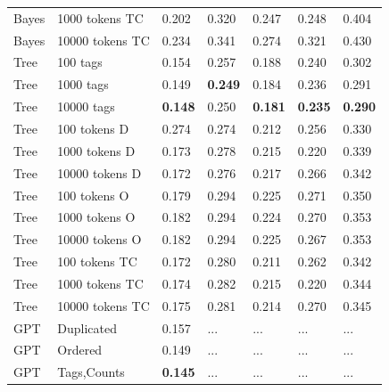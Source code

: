 \documentclass[sn-mathphys]{sn-jnl}%
\theoremstyle{thmstyleone}%
\theoremstyle{thmstyletwo}%
\theoremstyle{thmstylethree}%
\begin{document}
\begin{table}[h!]
\begin{center}
\begin{minipage}{\textwidth}
\begin{tabular}{@{}lllllll@{}}
      Bayes     & 1000 tokens TC                      & 0.202            & 0.320           & 0.247          & 0.248           & 0.404          \\
      Bayes     & 10000 tokens TC                     & 0.234            & 0.341           & 0.274          & 0.321           & 0.430          \\
      \midrule
      Tree      & 100 tags                            & 0.154            & 0.257           & 0.188          & 0.240           & 0.302          \\
      Tree      & 1000 tags                           & 0.149            &\textbf{0.249}   & 0.184          & 0.236           & 0.291          \\
      Tree      & 10000 tags                          &\textbf{0.148}    & 0.250           &\textbf{0.181}  &\textbf{0.235}   &\textbf{0.290}  \\
      Tree      & 100 tokens D                        & 0.274            & 0.274           & 0.212          & 0.256           & 0.330          \\
      Tree      & 1000 tokens D                       & 0.173            & 0.278           & 0.215          & 0.220           & 0.339          \\
      Tree      & 10000 tokens D                      & 0.172            & 0.276           & 0.217          & 0.266           & 0.342          \\
      Tree      & 100 tokens O                        & 0.179            & 0.294           & 0.225          & 0.271           & 0.350          \\
      Tree      & 1000 tokens O                       & 0.182            & 0.294           & 0.224          & 0.270           & 0.353          \\
      Tree      & 10000 tokens O                      & 0.182            & 0.294           & 0.225          & 0.267           & 0.353          \\
      Tree      & 100 tokens TC                       & 0.172            & 0.280           & 0.211          & 0.262           & 0.342          \\
      Tree      & 1000 tokens TC                      & 0.174            & 0.282           & 0.215          & 0.220           & 0.344          \\
      Tree      & 10000 tokens TC                     & 0.175            & 0.281           & 0.214          & 0.270           & 0.345          \\
      \midrule
      GPT       & Duplicated\footnotemark[5]          & 0.157            & ...             & ...            & ...             & ...            \\
      GPT       & Ordered\footnotemark[6]             & 0.149            & ...             & ...            & ...             & ...            \\
      GPT       & Tags,Counts\footnotemark[7]         & \textbf{0.145}   & ...             & ...            & ...             & ...            \\


\end{tabular}
\end{minipage}
\end{center}
\end{table}
\end{document}
